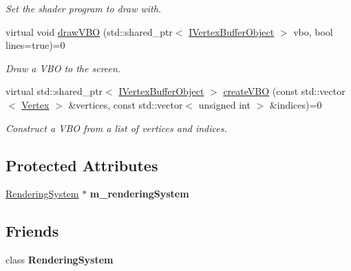 \begin{DoxyCompactItemize}
\begin{DoxyCompactList}\small\item\em Set the shader program to draw with. \end{DoxyCompactList}\item 
virtual void \hyperlink{class_lots_of_lines_1_1_i_renderer_a9d24612fea435f65dcf7d013e6693b2a}{draw\+V\+BO} (std\+::shared\+\_\+ptr$<$ \hyperlink{class_lots_of_lines_1_1_i_vertex_buffer_object}{I\+Vertex\+Buffer\+Object} $>$ vbo, bool lines=true)=0
\begin{DoxyCompactList}\small\item\em Draw a V\+BO to the screen. \end{DoxyCompactList}\item 
virtual std\+::shared\+\_\+ptr$<$ \hyperlink{class_lots_of_lines_1_1_i_vertex_buffer_object}{I\+Vertex\+Buffer\+Object} $>$ \hyperlink{class_lots_of_lines_1_1_i_renderer_a0e9e0b2bc328bd13f88fea74da6e8abc}{create\+V\+BO} (const std\+::vector$<$ \hyperlink{struct_lots_of_lines_1_1_vertex}{Vertex} $>$ \&vertices, const std\+::vector$<$ unsigned int $>$ \&indices)=0\hypertarget{class_lots_of_lines_1_1_i_renderer_a0e9e0b2bc328bd13f88fea74da6e8abc}{}\label{class_lots_of_lines_1_1_i_renderer_a0e9e0b2bc328bd13f88fea74da6e8abc}

\begin{DoxyCompactList}\small\item\em Construct a V\+BO from a list of vertices and indices. \end{DoxyCompactList}\end{DoxyCompactItemize}
\subsection*{Protected Attributes}
\begin{DoxyCompactItemize}
\item 
\hyperlink{class_lots_of_lines_1_1_rendering_system}{Rendering\+System} $\ast$ {\bfseries m\+\_\+rendering\+System}\hypertarget{class_lots_of_lines_1_1_i_renderer_a0bb52a5e85e8f701b5b846d9286c08f5}{}\label{class_lots_of_lines_1_1_i_renderer_a0bb52a5e85e8f701b5b846d9286c08f5}

\end{DoxyCompactItemize}
\subsection*{Friends}
\begin{DoxyCompactItemize}
\item 
class {\bfseries Rendering\+System}\hypertarget{class_lots_of_lines_1_1_i_renderer_a8973bdd326799bb9e3e2d3bf6c98778d}{}\label{class_lots_of_lines_1_1_i_renderer_a8973bdd326799bb9e3e2d3bf6c98778d}

\end{DoxyCompactItemize}



